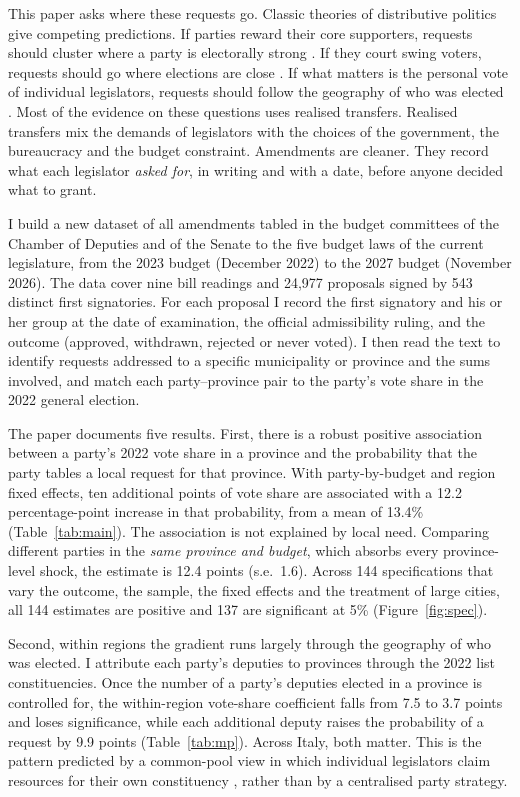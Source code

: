 \documentclass[12pt]{article}
\begin{document}
This paper asks where these requests go. Classic theories of distributive politics give competing predictions. If parties reward their core supporters, requests should cluster where a party is electorally strong \citep{cox1986}. If they court swing voters, requests should go where elections are close \citep{lindbeck1987,dixit1996}. If what matters is the personal vote of individual legislators, requests should follow the geography of who was elected \citep{golden2008,carozzi2016}. Most of the evidence on these questions uses realised transfers. Realised transfers mix the demands of legislators with the choices of the government, the bureaucracy and the budget constraint. Amendments are cleaner. They record what each legislator \emph{asked for}, in writing and with a date, before anyone decided what to grant.

I build a new dataset of all amendments tabled in the budget committees of the Chamber of Deputies and of the Senate to the five budget laws of the current legislature, from the 2023 budget (December 2022) to the 2027 budget (November 2026). The data cover nine bill readings and 24,977 proposals signed by 543 distinct first signatories. For each proposal I record the first signatory and his or her group at the date of examination, the official admissibility ruling, and the outcome (approved, withdrawn, rejected or never voted). I then read the text to identify requests addressed to a specific municipality or province and the sums involved, and match each party--province pair to the party's vote share in the 2022 general election.

The paper documents five results. First, there is a robust positive association between a party's 2022 vote share in a province and the probability that the party tables a local request for that province. With party-by-budget and region fixed effects, ten additional points of vote share are associated with a 12.2 percentage-point increase in that probability, from a mean of 13.4\% (Table~\ref{tab:main}). The association is not explained by local need. Comparing different parties in the \emph{same province and budget}, which absorbs every province-level shock, the estimate is 12.4 points (s.e.\ 1.6). Across 144 specifications that vary the outcome, the sample, the fixed effects and the treatment of large cities, all 144 estimates are positive and 137 are significant at 5\% (Figure~\ref{fig:spec}).

Second, within regions the gradient runs largely through the geography of who was elected. I attribute each party's deputies to provinces through the 2022 list constituencies. Once the number of a party's deputies elected in a province is controlled for, the within-region vote-share coefficient falls from 7.5 to 3.7 points and loses significance, while each additional deputy raises the probability of a request by 9.9 points (Table~\ref{tab:mp}). Across Italy, both matter. This is the pattern predicted by a common-pool view in which individual legislators claim resources for their own constituency \citep{weingast1981,perssontabellini1999}, rather than by a centralised party strategy.
\end{document}
